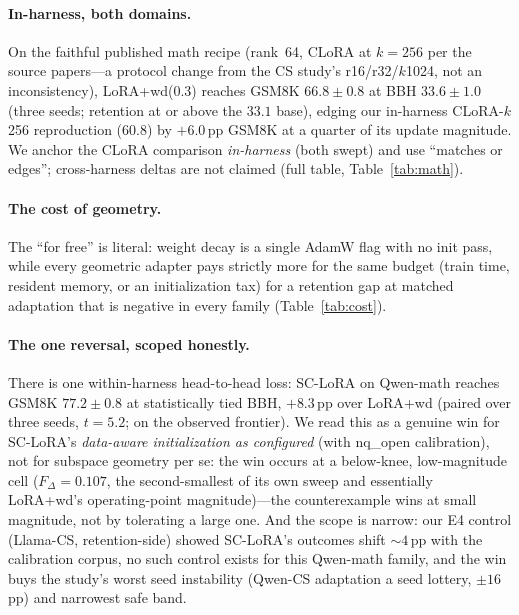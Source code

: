 \documentclass[11pt]{article}
\newcommand{\dw}{F_{\Delta}}
\begin{document}
\paragraph{In-harness, both domains.} On the faithful published math recipe
(rank~64, CLoRA at $k{=}256$ per the source papers---a protocol change from the CS
study's r16/r32/$k$1024, not an inconsistency), LoRA{+}wd(0.3) reaches GSM8K
$66.8\!\pm\!0.8$ at BBH $33.6\!\pm\!1.0$ (three seeds; retention at or above the
$33.1$ base), edging our in-harness CLoRA-$k$256 reproduction ($60.8$) by
$+6.0$\,pp GSM8K at a quarter of its update magnitude. We anchor the CLoRA
comparison \emph{in-harness} (both swept) and use ``matches or edges'';
cross-harness deltas are not claimed (full table, Table~\ref{tab:math}).

\paragraph{The cost of geometry.} The ``for free'' is literal: weight decay is a
single AdamW flag with no init pass, while every geometric adapter pays strictly
more for the same budget (train time, resident memory, or an initialization tax)
for a retention gap at matched adaptation that is negative in every family
(Table~\ref{tab:cost}).

\paragraph{The one reversal, scoped honestly.} There is one within-harness
head-to-head loss: SC-LoRA on Qwen-math reaches GSM8K $77.2\!\pm\!0.8$ at
statistically tied BBH, $+8.3$\,pp over LoRA{+}wd (paired over three seeds,
$t\!=\!5.2$; on the observed frontier). We read this as a genuine win for
SC-LoRA's \emph{data-aware initialization as configured} (with nq\_open
calibration), not for subspace geometry per se: the win occurs at a below-knee,
low-magnitude cell ($\dw\!=\!0.107$, the second-smallest of its own sweep and
essentially LoRA{+}wd's operating-point magnitude)---the counterexample wins at
small magnitude, not by tolerating a large one. And the scope is narrow: our E4
control (Llama-CS, retention-side) showed SC-LoRA's outcomes shift $\sim\!4$\,pp
with the calibration corpus, no such control exists for this Qwen-math family, and
the win buys the study's worst seed instability (Qwen-CS adaptation a seed lottery,
$\pm\!16$\,pp) and narrowest safe band.
\end{document}

